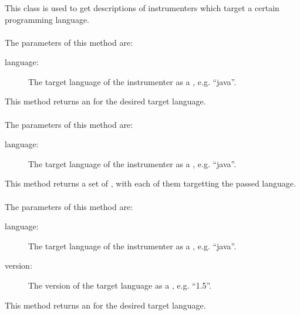 \subsubsection{} \label{Classes:Instrumentation:InstrumenterProvider}

This class is used to get descriptions of instrumenters which target a certain programming language.

\paragraph{} \label{Classes:Instrumentation:InstrumenterProvider:getFirstInstrumenterDescriptor}
The parameters of this method are:
\begin{description}
\item[language:] The target language of the instrumenter as a , e.g. ``java''.

\end{description}
This method returns an  for the desired target language.

\paragraph{} \label{Classes:Instrumentation:InstrumenterProvider:getInstrumenterDescriptors_language}
The parameters of this method are:
\begin{description}
\item[language:] The target language of the instrumenter as a , e.g. ``java''.

\end{description}
This method returns a set of , with each of them targetting the passed language.

\paragraph{} \label{Classes:Instrumentation:InstrumenterProvider:getFirstInstrumenterDescriptor_version}
The parameters of this method are:
\begin{description}
\item[language:] The target language of the instrumenter as a , e.g. ``java''.
\item[version:] The version of the target language as a , e.g. ``1.5''.

\end{description}
This method returns an  for the desired target language.

